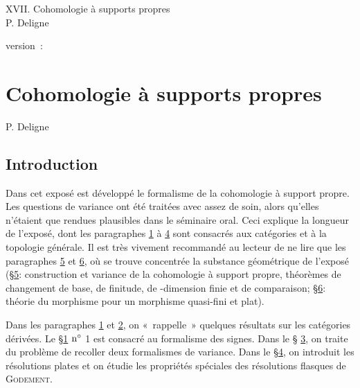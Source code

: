 \documentclass[10pt]{../fichiers-configuration-latex/smfart}
\begin{document}
\begin{center}
XVII. Cohomologie à supports propres\\
P. Deligne 
\end{center}

version : \showgitstatus{}
\tableofcontents
\mainmatter

\else
\chapter{Cohomologie à supports propres}
\begin{center}
P. Deligne 
\end{center}
\fi

\setcounter{pageoriginal}{251}



\section*{Introduction}\pageoriginale

Dans cet exposé est développé le formalisme de la cohomologie à
support propre. Les questions de variance ont été traitées avec assez
de soin, alors qu'elles n'étaient que rendues plausibles dans le
séminaire oral. Ceci explique la longueur de l'exposé, dont les
paragraphes \hyperref[XVII.sec1]{1} à \hyperref[XVII.sec4]{4} sont consacrés aux catégories et à la
topologie générale. Il est très vivement recommandé au lecteur de ne
lire que les paragraphes \hyperref[XVII.sec5]{5} et \hyperref[XVII.sec6]{6}, où se
trouve concentrée la substance géométrique de l'exposé (\S \hyperref[XVII.sec5]{5}:
construction et variance de la cohomologie à support propre, théorèmes
de changement de base, de finitude, de \tTor-dimension finie et de
comparaison; \S \hyperref[XVII.sec6]{6}: théorie du morphisme  pour un morphisme
quasi-fini et plat).

Dans les paragraphes \hyperref[XVII.sec1]{1} et \hyperref[XVII.sec2]{2}, on « rappelle » quelques résultats sur les catégories dérivées. Le \S \hyperref[XVII.sec1]{1}
${\rm n^{\circ}}$ 1 est consacré au formalisme des signes. Dans le \S
\hyperref[XVII.sec3]{3}, on traite du problème de recoller deux formalismes de
variance. Dans le \S \hyperref[XVII.sec4]{4}, on introduit les résolutions plates et on
étudie les propriétés spéciales des résolutions flasques de
\textsc{Godement}.
\end{document}
